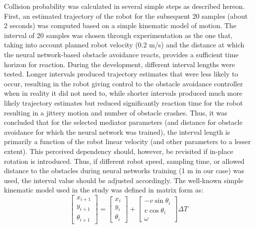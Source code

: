 Collision probability was calculated in several simple steps as described hereon. First, an estimated trajectory of the robot for the subsequent 20 samples (about 2 seconds) was computed based on a simple kinematic model of motion. The interval of 20 samples was chosen through experimentation as the one that, taking into account planned robot velocity (0.2 m/s) and the distance at which the neural network-based obstacle avoidance reacts, provides a sufficient time horizon for reaction. During the development, different interval lengths were tested. Longer intervals produced trajectory estimates that were less likely to occur, resulting in the robot giving control to the obstacle avoidance controller when in reality it did not need to, while shorter intervals produced much more likely trajectory estimates but reduced significantly reaction time for the robot resulting in a jittery motion and number of obstacle crashes. Thus, it was concluded that for the selected mediator parameters (and distance for obstacle avoidance for which the neural network was trained), the interval length is primarily a function of the robot linear velocity (and other parameters to a lesser extent). This perceived dependency should, however, be revisited if in-place rotation is introduced. Thus, if different robot speed, sampling time, or allowed distance to the obstacles during neural networks training (1 m in our case) was used, the interval value should be adjusted accordingly. The well-known simple kinematic model used in the study was defined in matrix form as:
\begin{equation}
    \begin{bmatrix}
        x_{i+1}\\
        y_{i+1}\\
        \theta_{i+1}
    \end{bmatrix} = 
    \begin{bmatrix}
        x_{i}\\
        y_{i}\\
        \theta_{i}
    \end{bmatrix} + 
    \begin{bmatrix}
        -v \sin{\theta_{i}}\\
        v \cos{\theta_{i}}\\
        \omega
    \end{bmatrix}\Delta T
\end{equation}
